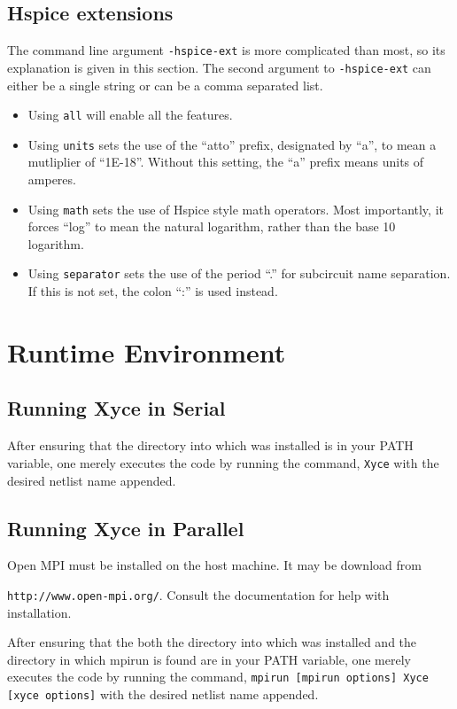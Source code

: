\section{Hspice extensions}
\label{hspice_ext_cmd_line}

The command line argument \verb+-hspice-ext+ is more complicated than most, so its explanation is given in this section.
The second argument to \verb+-hspice-ext+ can either be a single string or can be a comma separated list.
\begin{itemize}
\item Using \verb+all+ will enable all the features.   
\item Using \verb+units+ sets the use of the ``atto'' prefix, designated by ``a'', to mean a mutliplier of ``1E-18''.   Without this setting, the ``a'' prefix means units of amperes.
\item Using \verb+math+ sets the use of Hspice style math operators.  Most importantly, it forces ``log'' to mean the natural logarithm, rather than the base 10 logarithm.
\item Using \verb+separator+ sets the use of the period ``.'' for subcircuit name separation.  If this is not set, the colon ``:'' is used instead.
\end{itemize}

\chapter{Runtime Environment}
\label{runtime}

\section{Running Xyce in Serial}

After ensuring that the directory into which \Xyce{} was installed is
in your PATH variable, one merely executes the code by running the
command, \texttt{Xyce} with the desired netlist name appended.

\section{Running Xyce in Parallel}

Open MPI must be installed on the host machine.  It may be download from 

\texttt{http://www.open-mpi.org/}.  Consult the documentation for help with installation.

After ensuring that the both the directory into which \Xyce{} was
installed and the directory in which mpirun is found are in your PATH
variable, one merely executes the code by running the command,
\texttt{mpirun [mpirun options] Xyce [xyce options]} with the desired
netlist name appended.

